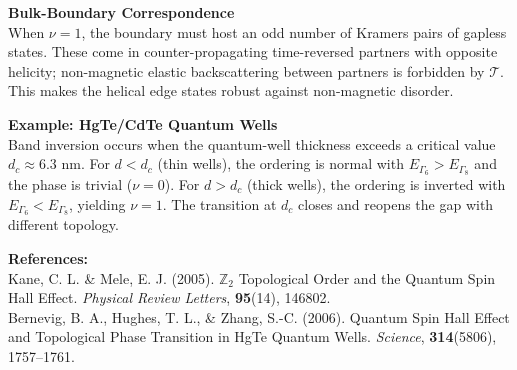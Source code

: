 \begin{technical}
\textbf{Bulk-Boundary Correspondence}\\[0.5em]
When $\nu = 1$, the boundary must host an odd number of Kramers pairs of gapless states. These come in counter-propagating time-reversed partners with opposite helicity; non-magnetic elastic backscattering between partners is forbidden by $\mathcal{T}$. This makes the helical edge states robust against non-magnetic disorder.

\textbf{Example: HgTe/CdTe Quantum Wells}\\[0.5em]
Band inversion occurs when the quantum-well thickness exceeds a critical value $d_c \approx 6.3$ nm. For $d < d_c$ (thin wells), the ordering is normal with $E_{\Gamma_6} > E_{\Gamma_8}$ and the phase is trivial ($\nu = 0$). For $d > d_c$ (thick wells), the ordering is inverted with $E_{\Gamma_6} < E_{\Gamma_8}$, yielding $\nu = 1$. The transition at $d_c$ closes and reopens the gap with different topology.

\vspace{0.5em}
\textbf{References:}\\
{\footnotesize
Kane, C. L. \& Mele, E. J. (2005). $\mathbb{Z}_2$ Topological Order and the Quantum Spin Hall Effect. \textit{Physical Review Letters}, \textbf{95}(14), 146802.\\
Bernevig, B. A., Hughes, T. L., \& Zhang, S.-C. (2006). Quantum Spin Hall Effect and Topological Phase Transition in HgTe Quantum Wells. \textit{Science}, \textbf{314}(5806), 1757--1761.
}
\end{technical}
